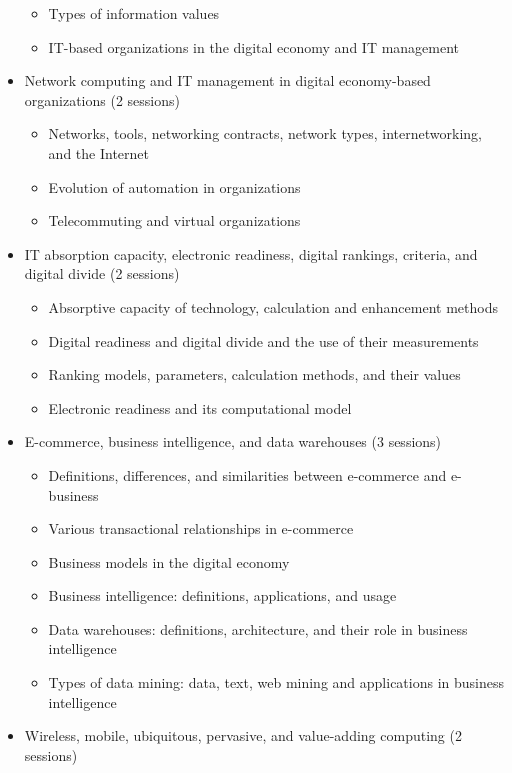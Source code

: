 \documentclass[12pt]{article}
\begin{document}
\begin{itemize}
\begin{itemize}
        \item Types of information values
        \item IT-based organizations in the digital economy and IT management
    \end{itemize}
    \item Network computing and IT management in digital economy-based organizations (2 sessions)
    \begin{itemize}
        \item Networks, tools, networking contracts, network types, internetworking, and the Internet
        \item Evolution of automation in organizations
        \item Telecommuting and virtual organizations
    \end{itemize}
    \item IT absorption capacity, electronic readiness, digital rankings, criteria, and digital divide (2 sessions)
    \begin{itemize}
        \item Absorptive capacity of technology, calculation and enhancement methods
        \item Digital readiness and digital divide and the use of their measurements
        \item Ranking models, parameters, calculation methods, and their values
        \item Electronic readiness and its computational model
    \end{itemize}
    \item E-commerce, business intelligence, and data warehouses (3 sessions)
    \begin{itemize}
        \item Definitions, differences, and similarities between e-commerce and e-business
        \item Various transactional relationships in e-commerce
        \item Business models in the digital economy
        \item Business intelligence: definitions, applications, and usage
        \item Data warehouses: definitions, architecture, and their role in business intelligence
        \item Types of data mining: data, text, web mining and applications in business intelligence
    \end{itemize}
    \item Wireless, mobile, ubiquitous, pervasive, and value-adding computing (2 sessions)

\end{itemize}
\end{document}
